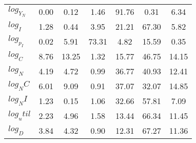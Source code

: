 \begin{center}
\begin{longtable}{lcccccc}
$log_Y_N   $	 & 	        0.00	 & 	        0.12	 & 	        1.46	 & 	       91.76	 & 	        0.31	 & 	        6.34 \\ 
$log_I     $	 & 	        1.28	 & 	        0.44	 & 	        3.95	 & 	       21.21	 & 	       67.30	 & 	        5.82 \\ 
$log_p_I   $	 & 	        0.02	 & 	        5.91	 & 	       73.31	 & 	        4.82	 & 	       15.59	 & 	        0.35 \\ 
$log_C     $	 & 	        8.76	 & 	       13.25	 & 	        1.32	 & 	       15.77	 & 	       46.75	 & 	       14.15 \\ 
$log_N     $	 & 	        4.19	 & 	        4.72	 & 	        0.99	 & 	       36.77	 & 	       40.93	 & 	       12.41 \\ 
$log_NC    $	 & 	        6.01	 & 	        9.09	 & 	        0.91	 & 	       37.07	 & 	       32.07	 & 	       14.85 \\ 
$log_NI    $	 & 	        1.23	 & 	        0.15	 & 	        1.06	 & 	       32.66	 & 	       57.81	 & 	        7.09 \\ 
$log_util  $	 & 	        2.23	 & 	        4.96	 & 	        1.58	 & 	       13.44	 & 	       66.34	 & 	       11.45 \\ 
$log_D     $	 & 	        3.84	 & 	        4.32	 & 	        0.90	 & 	       12.31	 & 	       67.27	 & 	       11.36 \\ 
\end{longtable}
 \end{center}
